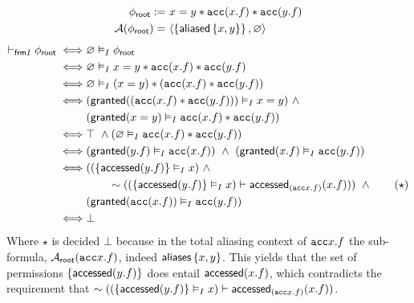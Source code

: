 \begin{align*}
\phi_\textsf{root} := & \ x = y \ast \texttt{acc}(x.f) \ast \texttt{acc}(y.f)
\\
\mathcal{A}(\phi_\textsf{root}) = & \ \langle  \left\{ \textsf{aliased}\left\{ x,y \right\} \right\} ,  \varnothing  \rangle
\end{align*}
\begin{align*}
\vdash_{\textsf{frm}I} \phi_\textsf{root}
\iff &
\varnothing \vDash_I \phi_\textsf{root}
\\ \iff &
\varnothing \vDash_I x = y \ast \texttt{acc}(x.f) \ast \texttt{acc}(y.f)
\\ \iff &
\varnothing \vDash_I (x = y) \ast (\texttt{acc}(x.f) \ast \texttt{acc}(y.f))
\\ \iff &
(\textsf{granted}((\texttt{acc}(x.f) \ast \texttt{acc}(y.f))) \vDash_I x = y) \ \land \\ &
(\textsf{granted}(x = y) \vDash_I \texttt{acc}(x.f) \ast \texttt{acc}(y.f))
\\ \iff &
\top \ \land (\varnothing \vDash_I \texttt{acc}(x.f) \ast \texttt{acc}(y.f))
\\ \iff &
(\textsf{granted}(y.f) \vDash_I \texttt{acc}(x.f)) \ \land \
(\textsf{granted}(x.f) \vDash_I \texttt{acc}(y.f))
\\ \iff &
(
  (\left\{  \textsf{accessed}(y.f)  \right\} \vDash_I x) \ \land \\ & \hspace{2em}
  \sim ((\left\{  \textsf{accessed}(y.f)  \right\} \vDash_I x) \vdash \textsf{accessed}_{(\texttt{acc}{x.f})}(x.f))
)
\ \land \tag{$\star$} \\ &
(\textsf{granted}(\texttt{acc}(x.f)) \vDash_I \texttt{acc}(y.f))
\\ \iff &
\bot
\end{align*}
Where $\star$ is decided $\bot$ because in the total aliasing context of $\texttt{acc}{x.f}$ the sub-formula, $\mathcal{A}_\textsf{root}(\texttt{acc}{x.f})$, indeed $\textsf{aliases}\left\{ x,y \right\}$. This yields that the set of permissions $\left\{  \textsf{accessed}(y.f) \right\}$ does entail $\textsf{accessed}(x.f)$, which contradicts the requirement that $\sim ((\left\{  \textsf{accessed}(y.f)  \right\} \vDash_I x) \vdash \textsf{accessed}_{(\texttt{acc}{x.f})}(x.f))$.
